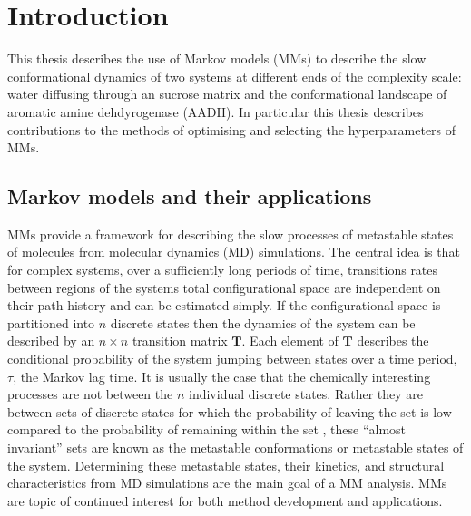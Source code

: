 %
%
\let\textcircled=\pgftextcircled
\chapter{Introduction}
\label{chap:intro}
This thesis describes the use of Markov models (MMs) to describe the slow conformational  dynamics of two systems at different ends of the complexity scale: water diffusing through an sucrose matrix and the conformational landscape of aromatic amine dehdyrogenase (AADH). In particular this thesis describes contributions to the methods of optimising and selecting the hyperparameters of MMs. 

\section{Markov models and their applications}
MMs provide a framework for describing the slow processes of metastable states of molecules from molecular dynamics (MD) simulations\cite{prinzMarkovModelsMolecular2011}. The central idea\cite{zwanzigClassicalDynamicsContinuous1983a} is that for complex systems, over a sufficiently long periods of time, transitions rates between regions of the systems total configurational space are independent on their path history and can be estimated simply. If the configurational space is partitioned into $n$ discrete states then the dynamics of the system can be described by an $n\times n$ transition matrix $\mathbf{T}$\cite{prinzMarkovModelsMolecular2011}. Each element of $\mathbf{T}$ describes the conditional probability of the system jumping between states\cite{prinzMarkovModelsMolecular2011} over a time period, $\tau$, the Markov lag time. It is usually the case that the chemically interesting processes are not between the $n$ individual discrete states. Rather they are between sets of discrete states for which the probability of leaving the set is low compared to the probability of remaining within the set \cite{schutteDirectApproachConformational1999}, these ``almost invariant'' sets are known as the metastable conformations or metastable states of the system. Determining these metastable states, their kinetics, and structural characteristics from MD simulations are the main goal of a MM analysis. MMs are  topic of continued interest \cite{husicMarkovStateModels2018,noeMarkovModelsMolecular2019b, wangConstructingMarkovState2018c} for both method development and applications.  

